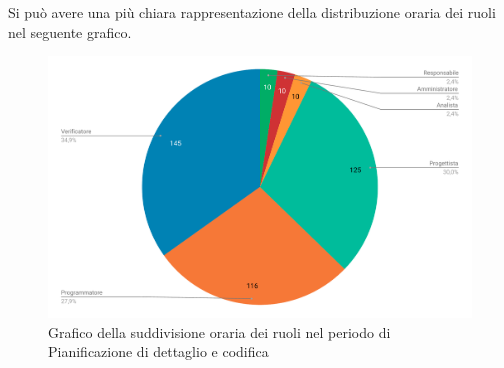 Si può avere una più chiara rappresentazione della distribuzione oraria dei ruoli nel seguente grafico.

\begin{figure}[H]
\centering
	\includegraphics[width=1\linewidth]{Preventivo/grafici/PC2_1.pdf}
	\caption{Grafico della suddivisione oraria dei ruoli nel periodo di Pianificazione di dettaglio e codifica}
\end{figure}

